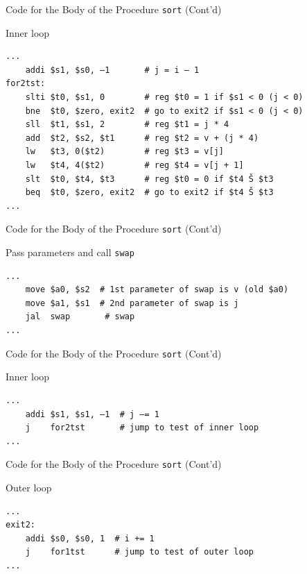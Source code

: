\begin{frame}[fragile]{Code for the Body of the Procedure \texttt{sort} (Cont'd)}
\begin{flushleft}
Inner loop
\begin{lstlisting}[keywordstyle=\color{purple}\textbf, keywords={addi, slti, bne, add, sll, lw, slt, beq}, numbers=none]
...
    addi $s1, $s0, –1       # j = i – 1
for2tst: 
    slti $t0, $s1, 0        # reg $t0 = 1 if $s1 < 0 (j < 0)
    bne  $t0, $zero, exit2  # go to exit2 if $s1 < 0 (j < 0)
    sll  $t1, $s1, 2        # reg $t1 = j * 4
    add  $t2, $s2, $t1      # reg $t2 = v + (j * 4)
    lw   $t3, 0($t2)        # reg $t3 = v[j]
    lw   $t4, 4($t2)        # reg $t4 = v[j + 1]
    slt  $t0, $t4, $t3      # reg $t0 = 0 if $t4 Š $t3
    beq  $t0, $zero, exit2  # go to exit2 if $t4 Š $t3
...
\end{lstlisting}
\end{flushleft}
\end{frame}

\begin{frame}[fragile]{Code for the Body of the Procedure \texttt{sort} (Cont'd)}
    \begin{flushleft}
Pass parameters and call \texttt{swap}
\begin{lstlisting}[keywordstyle=\color{purple}\textbf, keywords={move, jal}, numbers=none]
...
    move $a0, $s2  # 1st parameter of swap is v (old $a0)
    move $a1, $s1  # 2nd parameter of swap is j
    jal  swap       # swap
...
\end{lstlisting}
\end{flushleft}
\end{frame}

\begin{frame}[fragile]{Code for the Body of the Procedure \texttt{sort} (Cont'd)}
\begin{flushleft}
Inner loop
\begin{lstlisting}[keywordstyle=\color{purple}\textbf, keywords={addi, j}, numbers=none]
...
    addi $s1, $s1, –1  # j –= 1
    j    for2tst       # jump to test of inner loop
...
\end{lstlisting}
\end{flushleft}
\end{frame}

\begin{frame}[fragile]{Code for the Body of the Procedure \texttt{sort} (Cont'd)}
\begin{flushleft}
Outer loop
\begin{lstlisting}[keywordstyle=\color{purple}\textbf, keywords={addi, j}, numbers=none]
...
exit2:
    addi $s0, $s0, 1  # i += 1
    j    for1tst      # jump to test of outer loop
...
\end{lstlisting}
\end{flushleft}
\end{frame}

